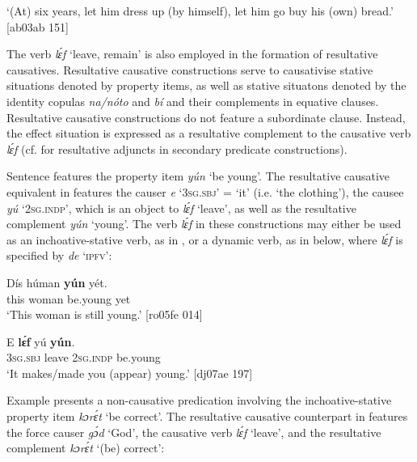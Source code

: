 \glt ‘(At) six years, let him dress up (by himself), let him go buy his (own) bread.’ [ab03ab 151]
\z

The verb \textit{lɛ́f} ‘leave, remain’ is also employed in the formation of resultative causatives{\fff}. Resultative causative constructions serve to causativise stative situations denoted by property items, as well as stative situatons denoted by the identity copulas \textit{na/nóto} and \textit{bí} and their complements in equative clauses{\fff}. Resultative causative constructions do not feature a subordinate clause. Instead, the effect situation is expressed as a resultative complement to the causative verb \textit{lɛ́f} (cf.  for resultative adjuncts in secondary predicate constructions).


Sentence  features the property item \textit{yún} ‘be young’. The resultative causative equivalent in  features the causer \textit{e} ‘\textsc{3sg.sbj}’ = ‘it’ (i.e. ‘the clothing’), the causee \textit{yú} ‘\textsc{2sg.indp}’, which is an object to \textit{lɛ́f} ‘leave’, as well as the resultative complement \textit{yún} ‘young’. The verb \textit{lɛ́f} in these constructions may either be used as an inchoative-stative verb, as in , or a dynamic verb, as in  below, where \textit{lɛ́f} is specified by \textit{de} ‘\textsc{ipfv}’: 



\ea%
    \label{ex:key:1334}
    \gll Dís  húman  \textbf{yún}      yét.\\
this  woman  be.young    yet\\

\glt ‘This woman is still young.’ [ro05fe 014]
\z


\ea%
    \label{ex:key:1335}
    \gll E    \textbf{lɛ́f}    yú    \textbf{yún}.\\
\textsc{3sg.sbj}  leave  \textsc{2sg.indp}  be.young\\

\glt ‘It makes/made you (appear) young.’ [dj07ae 197]
\z

Example  presents a non-causative predication involving the inchoative-stative property item \textit{kɔrɛ́t} ‘be correct’. The resultative causative counterpart in  features the force{\fff} causer{\fff} \textit{gɔ́d} ‘God’, the causative verb \textit{lɛ́f} ‘leave’, and the resultative complement \textit{kɔrɛ́t} ‘(be) correct’:


